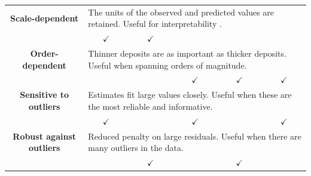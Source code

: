 \documentclass[a4paper,fleqn]{cas-sc}
\begin{document}
\begin{table}[]
\begin{tabular}{@{}lcccccc@{}}
    \multicolumn{2}{c}{\textbf{Scale-dependent}} & \multicolumn{5}{l}{The units of the observed and predicted values are retained. Useful for interpretability
    .}      \\
    \multicolumn{2}{c}{\textbf{}} & $\checkmark$                                                          & $\checkmark$                                                                     &                                                                          &                                                                                                     &                                                                                                   \\ %
    \multicolumn{2}{c}{\textbf{Order-dependent}} & \multicolumn{5}{l}{Thinner deposits are as important as thicker deposits. Useful when spanning orders of magnitude.} \\
    \multicolumn{2}{c}{\textbf{}}                                                                   &    &                                                                                  & $\checkmark$                                                             & $\checkmark$                                                                                        & $\checkmark$                                                                                      \\ \midrule
    \multicolumn{2}{c}{\textbf{Sensitive to outliers}} & \multicolumn{5}{l}{Estimates fit large values closely. Useful when these are the most reliable and informative.} \\
    \multicolumn{2}{c}{\textbf{}} & $\checkmark$                                                          &                                                                                  &   $\checkmark$                                                                       &                                                                                                     & $\checkmark$                                                                                      \\ %
    \multicolumn{2}{c}{\textbf{Robust against outliers}} & \multicolumn{5}{l}{Reduced penalty on large residuals. Useful when there are many outliers in the data.} \\
    \multicolumn{2}{c}{\textbf{}}       &       & $\checkmark$                                                                     &                                                              & $\checkmark$                                                                                        &                                                                              \\ \midrule

\end{tabular}
\end{table}
\end{document}
